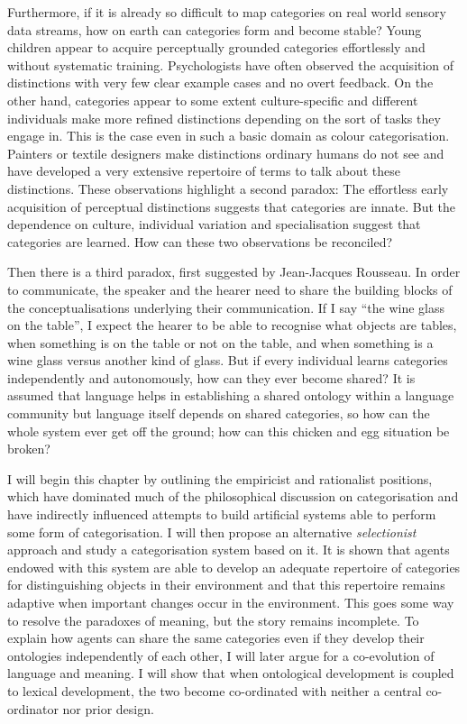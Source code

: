 Furthermore, if it is already so difficult to map
categories on real world sensory data streams, how 
on earth can categories form and become stable? 
Young children appear to acquire perceptually 
grounded categories effortlessly and without systematic 
training. Psychologists have often observed the 
acquisition of distinctions
with very few clear example cases and no overt feedback. 
On the other hand, categories appear to 
some extent culture-specific and different 
individuals make more refined distinctions depending
on the sort of tasks they engage in. This is 
the case even in such a basic domain as colour categorisation. 
Painters or textile designers make distinctions ordinary 
humans do not see and have developed a very extensive
repertoire of terms to talk about these distinctions. 
These observations highlight a second paradox: The 
effortless early acquisition of perceptual distinctions 
suggests that categories 
are innate. But the dependence on culture, individual
variation and specialisation suggest that categories
are learned. How can these two observations be reconciled? 

Then there is a third paradox, first suggested
by Jean-Jacques Rousseau. In order to communicate,
the speaker and the hearer need to share the building
blocks of the conceptualisations underlying their communication. 
If I say ``the wine glass on the table'', I expect 
the hearer to be able to recognise what objects are 
tables, when something is on the table or not on the table, and 
when something is a wine glass versus another kind 
of glass. But if every individual learns categories independently
and autonomously, how can they ever become shared? It is 
assumed that language helps in establishing a shared ontology within 
a language community but language itself depends on 
shared categories, so how can the whole system ever 
get off the ground; how can this chicken and egg situation
be broken?

I will begin this chapter by outlining the empiricist 
and rationalist positions, which have 
dominated much of the philosophical discussion on 
categorisation and have indirectly influenced attempts 
to build artificial systems able to perform some form
of categorisation. 
I will then propose an alternative {\itshape selectionist} approach
and study a categorisation system based on it. It is 
shown that agents endowed with this system are able
to develop an adequate repertoire of categories for 
distinguishing objects in their environment and that 
this repertoire remains adaptive when important changes 
occur in the environment. This goes some way to 
resolve the paradoxes of meaning, but the story remains
incomplete. To explain how agents can share the same 
categories even if they develop their ontologies 
independently of each other, I will later argue for
a co-evolution of language and meaning. I will show
that when ontological development is coupled to lexical 
development, the two become co-ordinated with neither
a central co-ordinator nor prior design. 


